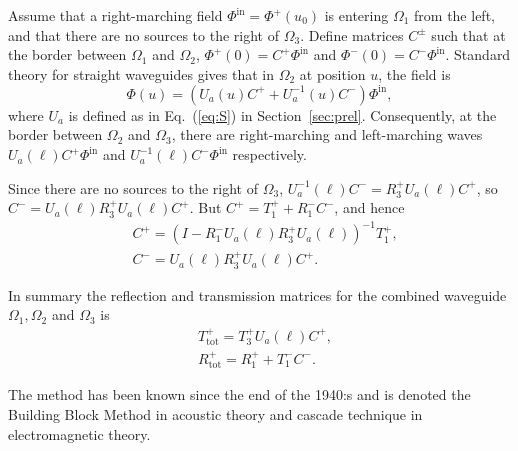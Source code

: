 \documentclass[numreferences]{kluwer}
\renewcommand{\Phi}{\varPhi}
\renewcommand{\vec}[1]{\bm{#1}}
\renewcommand{\Phi}{\varPhi}
\newcommand{\Phiin}{\vec\Phi^{\text{in}}}
\newcommand{\Ttot}{T^+_{\text{tot}}}
\newcommand{\Rtot}{R^+_{\text{tot}}}
\begin{document}
Assume that a right-marching field $\Phiin=\vec\Phi^+(u_0)$ is
entering $\Omega_1$ from the left, and that there are no sources to
the right of $\Omega_3$. Define matrices $C^\pm$ such that at the
border between $\Omega_1$ and $\Omega_2$, $\vec\Phi^+(0)=C^+\Phiin$
and $\vec\Phi^-(0)=C^-\Phiin$. Standard theory for straight waveguides
gives that in $\Omega_2$ at position $u$, the field is
\begin{equation}
  \label{eq:midfield}
  \vec\Phi(u)=(U_a(u)C^++U_a^{-1}(u)C^-)\Phiin,
\end{equation}
where $U_a$ is defined as in Eq.~(\ref{eq:S}) in
Section~\ref{sec:prel}.  Consequently, at the border between
$\Omega_2$ and $\Omega_3$, there are right-marching and left-marching
waves $U_a(\ell)C^+\Phiin$ and $U_a^{-1}(\ell)C^-\Phiin$ respectively.

Since there are no sources to the right of $\Omega_3$,
$U_a^{-1}(\ell)C^-=R_3^{+}U_a(\ell)C^+$, so
$C^-=U_a(\ell)R_3^{+}U_a(\ell)C^+$. But $C^+=T_1^{+}+R_1^{-}C^-$, and
hence
\begin{equation}
  \label{eq:ABRtotTtot}
  \begin{split}
    &C^+=\left(I-R_1^{-}U_a(\ell)R_3^{+}U_a(\ell)\right)^{-1}T_1^{+},\\
    &C^-=U_a(\ell)R_3^{+}U_a(\ell)C^+.
  \end{split}
\end{equation}

In summary the reflection and transmission matrices for the combined
waveguide $\Omega_1, \Omega_2$ and $\Omega_3$ is
\begin{equation}
  \label{eq:ABRtotTtot2}
  \begin{split}
    &\Ttot=T_3^{+}U_a(\ell)C^+,\\
    &\Rtot=R_1^{+}+T_1^{-}C^-.
  \end{split}
\end{equation}

The method has been known since the end of the 1940:s \cite{kerns1949}
and is denoted the Building Block Method \cite{nilssonbrander1981b} in
acoustic theory and cascade technique \cite{jones1986} in
electromagnetic theory.
\end{document}
